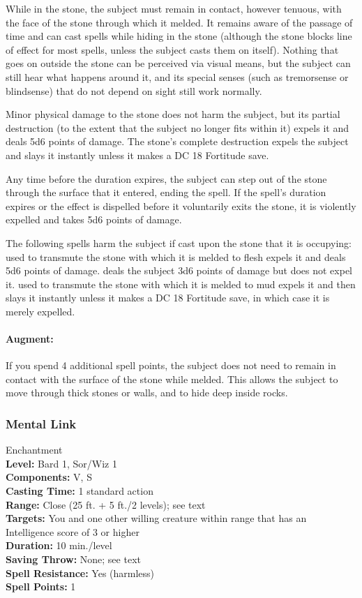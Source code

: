 While in the stone, the subject must remain in contact, however tenuous, with the face of the stone through which it melded. 
It remains aware of the passage of time and can cast spells while hiding in the stone (although the stone blocks line of effect for most spells, unless the subject casts them on itself). 
Nothing that goes on outside the stone can be perceived via visual means, but the subject can still hear what happens around it, and its special senses (such as tremorsense or blindsense) that do not depend on sight still work normally.

Minor physical damage to the stone does not harm the subject, but its partial destruction (to the extent that the subject no longer fits within it) expels it and deals 5d6 points of damage. 
The stone's complete destruction expels the subject and slays it instantly unless it makes a DC 18 Fortitude save.

Any time before the duration expires, the subject can step out of the stone through the surface that it entered, ending the spell. 
If the spell's duration expires or the effect is dispelled before it voluntarily exits the stone, it is violently expelled and takes 5d6 points of damage.

The following spells harm the subject if cast upon the stone that it is occupying:  used to transmute the stone with which it is melded to flesh expels it and deals 5d6 points of damage. 
 deals the subject 3d6 points of damage but does not expel it.  used to transmute the stone with which it is melded to mud expels it and then slays it instantly unless it makes a DC 18 Fortitude save, in which case it is merely expelled.

\paragraph{Augment:} If you spend 4 additional spell points, the subject does not need to remain in contact with the surface of the stone while melded. This allows the subject to move through thick stones or walls, and to hide deep inside rocks.
\subsubsection{Mental Link}
\label{Spell:MentalLink}
Enchantment
\\ \textbf{Level:} Bard 1, Sor/Wiz 1
\\ \textbf{Components:} V, S
\\ \textbf{Casting Time:} 1 standard action
\\ \textbf{Range:} Close (25 ft. + 5 ft./2 levels); see text
\\ \textbf{Targets:} You and one other willing creature within range that has an Intelligence score of 3 or higher
\\ \textbf{Duration:} 10 min./level
\\ \textbf{Saving Throw:} None; see text
\\ \textbf{Spell Resistance:} Yes (harmless)
\\ \textbf{Spell Points:} 1

